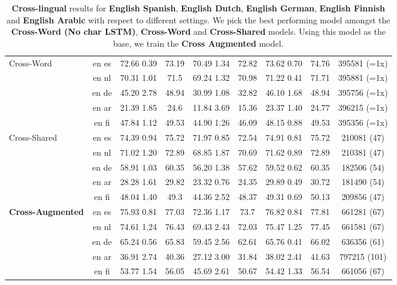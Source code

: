 \documentclass[letterpaper]{article} \usepackage{aaai20}  \usepackage{times}  \usepackage{helvet} \usepackage{courier}  \usepackage[hyphens]{url}  \usepackage{graphicx} \urlstyle{rm} \def\UrlFont{\rm}  \usepackage{graphicx}  \frenchspacing  \setlength{\pdfpagewidth}{8.5in}  \setlength{\pdfpageheight}{11in}
\begin{document}
\begin{table*}[t!]
{\begin{tabular}{l|cccccccc}
\midrule 
\multirow{2}{*}{Cross-Word} & en  es & 72.66  0.39 & 73.19 & 70.49  1.34 & 72.82  & 73.62  0.70 & 74.76 & 395581 (=1x)\\
 & en  nl & 70.31  1.01 & 71.5 &  69.24  1.32 & 70.98 & 71.22   0.41 & 71.71 & 395881 (=1x)\\
 & en  de &  45.20  2.78 & 48.94 & 30.99  1.08 & 32.82 & 46.10  1.68 & 48.94 & 395756 (=1x)\\
 & en  ar & 21.39  1.85 & 24.6 & 11.84  3.69 & 15.36 & 23.37  1.40 & 24.77 & 396215 (=1x)\\
 & en  fi & 47.84  1.12 & 49.53 & 44.90  1.26 & 46.09 & 48.15  0.88 & 49.53 & 395356 (=1x)\\
\midrule 
\midrule 
\multirow{2}{*}{Cross-Shared} & en  es & 74.39  0.94 & 75.72 & 71.97  0.85 & 72.54 & 74.91  0.81 & 75.72 & 210081 (47)\\
  & en  nl & 71.02   1.20 & 72.89 &  68.85  1.87 & 70.69 & 71.62  0.89 & 72.89 & 210381 (47)\\
 & en  de & 58.91   1.03 & 60.35 & 56.20  1.38 & 57.62 & 59.52   0.62 & 60.35 & 182506 (54)\\
 & en  ar & 28.28  1.61 & 29.82 & 23.32  0.76 & 24.35 & 29.89  0.49 & 30.72 & 181490 (54)\\
  & en  fi & 48.04  1.40 & 49.3 & 44.36  2.52 & 48.37 & 49.31   0.69 & 50.13 & 209856 (47)\\
\midrule 
\midrule 
\midrule 
\multirow{2}{*}{\textbf{Cross-Augmented}} & en  es & 75.93  0.81 & 77.03 & 72.36  1.17 & 73.7 & 76.82  0.84 & 77.81 & 661281 (67)\\
 & en  nl & 74.61 1.24 & 76.43 & 69.43  2.43 & 72.03 & 75.47  1.25 & 77.45 & 661581 (67)\\
 & en  de & 65.24   0.56 & 65.83 & 59.45   2.56 & 62.61 & 65.76  0.41 & 66.02 & 636356  (61)\\
 & en  ar & 36.91   2.74 & 40.36 & 27.12  3.00 & 31.84 & 38.02  2.41 & 41.63 & 797215  (101)\\
  & en  fi & 53.77   1.54 & 56.05 & 45.69  2.61 &50.67 & 54.42  1.33 & 56.54 & 661056  (67)\\
\bottomrule
\end{tabular}
}
\caption{\label{table:results}\textbf{Cross-lingual} results for \textbf{English  Spanish}, \textbf{English  Dutch}, \textbf{English  German}, \textbf{English  Finnish} and \textbf{English  Arabic} with respect to different settings. We pick the best performing model amongst the \textbf{Cross-Word (No char LSTM)}, \textbf{Cross-Word} and \textbf{Cross-Shared} models. Using this model as the base, we train the \textbf{Cross Augmented} model.}


\end{table*}
\end{document}
